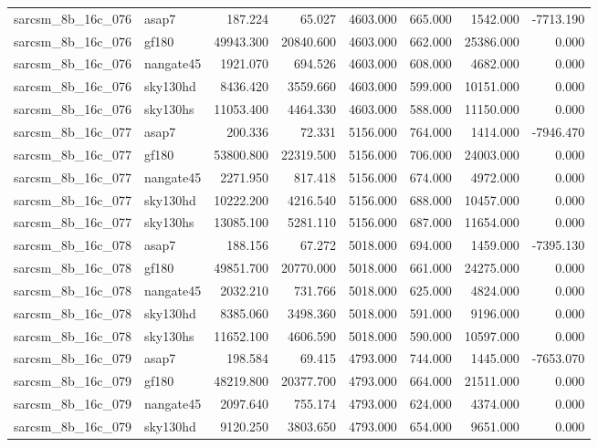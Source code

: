 \begin{tabular}{llrrrrrr}
sarcsm\_8b\_16c\_076 & asap7 & 187.224 & 65.027 & 4603.000 & 665.000 & 1542.000 & -7713.190 \\
sarcsm\_8b\_16c\_076 & gf180 & 49943.300 & 20840.600 & 4603.000 & 662.000 & 25386.000 & 0.000 \\
sarcsm\_8b\_16c\_076 & nangate45 & 1921.070 & 694.526 & 4603.000 & 608.000 & 4682.000 & 0.000 \\
sarcsm\_8b\_16c\_076 & sky130hd & 8436.420 & 3559.660 & 4603.000 & 599.000 & 10151.000 & 0.000 \\
sarcsm\_8b\_16c\_076 & sky130hs & 11053.400 & 4464.330 & 4603.000 & 588.000 & 11150.000 & 0.000 \\
sarcsm\_8b\_16c\_077 & asap7 & 200.336 & 72.331 & 5156.000 & 764.000 & 1414.000 & -7946.470 \\
sarcsm\_8b\_16c\_077 & gf180 & 53800.800 & 22319.500 & 5156.000 & 706.000 & 24003.000 & 0.000 \\
sarcsm\_8b\_16c\_077 & nangate45 & 2271.950 & 817.418 & 5156.000 & 674.000 & 4972.000 & 0.000 \\
sarcsm\_8b\_16c\_077 & sky130hd & 10222.200 & 4216.540 & 5156.000 & 688.000 & 10457.000 & 0.000 \\
sarcsm\_8b\_16c\_077 & sky130hs & 13085.100 & 5281.110 & 5156.000 & 687.000 & 11654.000 & 0.000 \\
sarcsm\_8b\_16c\_078 & asap7 & 188.156 & 67.272 & 5018.000 & 694.000 & 1459.000 & -7395.130 \\
sarcsm\_8b\_16c\_078 & gf180 & 49851.700 & 20770.000 & 5018.000 & 661.000 & 24275.000 & 0.000 \\
sarcsm\_8b\_16c\_078 & nangate45 & 2032.210 & 731.766 & 5018.000 & 625.000 & 4824.000 & 0.000 \\
sarcsm\_8b\_16c\_078 & sky130hd & 8385.060 & 3498.360 & 5018.000 & 591.000 & 9196.000 & 0.000 \\
sarcsm\_8b\_16c\_078 & sky130hs & 11652.100 & 4606.590 & 5018.000 & 590.000 & 10597.000 & 0.000 \\
sarcsm\_8b\_16c\_079 & asap7 & 198.584 & 69.415 & 4793.000 & 744.000 & 1445.000 & -7653.070 \\
sarcsm\_8b\_16c\_079 & gf180 & 48219.800 & 20377.700 & 4793.000 & 664.000 & 21511.000 & 0.000 \\
sarcsm\_8b\_16c\_079 & nangate45 & 2097.640 & 755.174 & 4793.000 & 624.000 & 4374.000 & 0.000 \\
sarcsm\_8b\_16c\_079 & sky130hd & 9120.250 & 3803.650 & 4793.000 & 654.000 & 9651.000 & 0.000 \\

\end{tabular}
